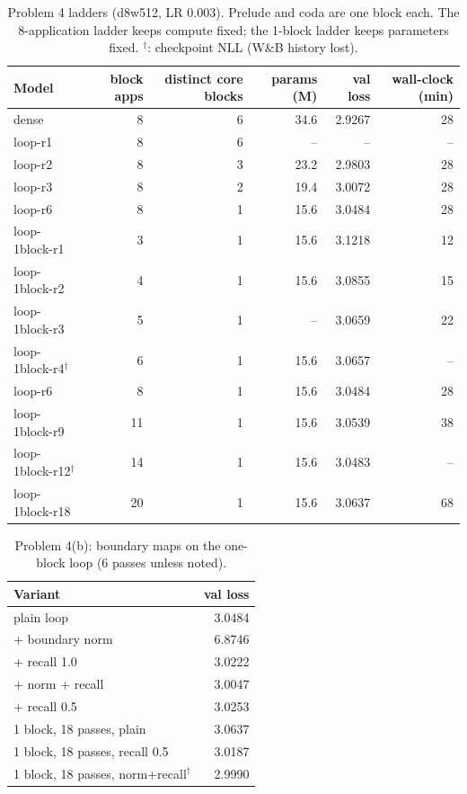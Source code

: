\begin{table}[H]\centering\small\caption{Problem 4 ladders (d8w512, LR 0.003). Prelude and coda are one block each. The 8-application ladder keeps compute fixed; the 1-block ladder keeps parameters fixed. $^\dagger$: checkpoint NLL (W\&B history lost).}\label{tab:p4ladder}\begin{tabular}{lrrrrr}\toprule
Model & block apps & distinct core blocks & params (M) & val loss & wall-clock (min) \\ \midrule
dense & 8 & 6 & 34.6 & 2.9267 & 28 \\
loop-r1 & 8 & 6 & -- & -- & -- \\
loop-r2 & 8 & 3 & 23.2 & 2.9803 & 28 \\
loop-r3 & 8 & 2 & 19.4 & 3.0072 & 28 \\
loop-r6 & 8 & 1 & 15.6 & 3.0484 & 28 \\
loop-1block-r1 & 3 & 1 & 15.6 & 3.1218 & 12 \\
loop-1block-r2 & 4 & 1 & 15.6 & 3.0855 & 15 \\
loop-1block-r3 & 5 & 1 & -- & 3.0659 & 22 \\
loop-1block-r4$^\dagger$ & 6 & 1 & 15.6 & 3.0657 & -- \\
loop-r6 & 8 & 1 & 15.6 & 3.0484 & 28 \\
loop-1block-r9 & 11 & 1 & 15.6 & 3.0539 & 38 \\
loop-1block-r12$^\dagger$ & 14 & 1 & 15.6 & 3.0483 & -- \\
loop-1block-r18 & 20 & 1 & 15.6 & 3.0637 & 68 \\
\bottomrule\end{tabular}\end{table}
\begin{table}[H]\centering\small\caption{Problem 4(b): boundary maps on the one-block loop (6 passes unless noted).}\label{tab:p4boundary}\begin{tabular}{lr}\toprule Variant & val loss \\ \midrule
plain loop & 3.0484 \\
+ boundary norm & 6.8746 \\
+ recall 1.0 & 3.0222 \\
+ norm + recall & 3.0047 \\
+ recall 0.5 & 3.0253 \\
1 block, 18 passes, plain & 3.0637 \\
1 block, 18 passes, recall 0.5 & 3.0187 \\
1 block, 18 passes, norm+recall$^\dagger$ & 2.9990 \\
\bottomrule\end{tabular}\end{table}
